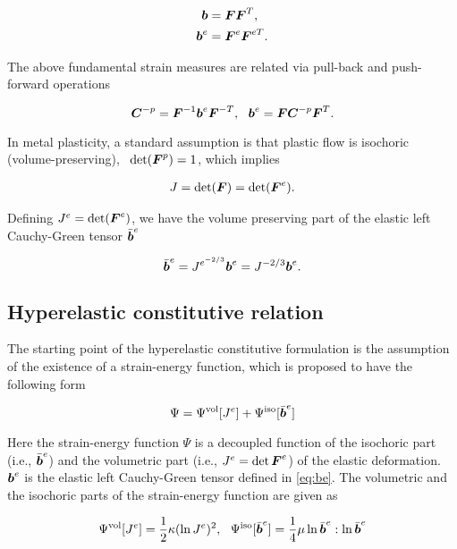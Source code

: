 \begin{align}
  {\boldsymbol{b}} &= {\boldsymbol{F}} {\boldsymbol{F}}^{T},\\
  {\boldsymbol{b}}^e &= {\boldsymbol{F}}^e {\boldsymbol{F}}^{eT}.\label{eq:be}\\
\end{align}

The above fundamental strain measures are related via pull-back and
push-forward operations

\begin{equation}\label{eq:pullpush}
  {\boldsymbol{C}}^{-p} ={\boldsymbol{F}}^{-1} {\boldsymbol{b}}^e {\boldsymbol{F}}^{-T},~~{\boldsymbol{b}}^e = {\boldsymbol{F}} {\boldsymbol{C}}^{-p} {\boldsymbol{F}}^T.
\end{equation}

In metal plasticity, a standard assumption is that plastic flow
is isochoric (volume-preserving), \ie\ $\det({\boldsymbol{F}}^p)=1$, which implies

\begin{align}
  J = \det ({\boldsymbol{F}}) = \det ({\boldsymbol{F}}^e).
\end{align}

Defining $J^e=\det({\boldsymbol{F}}^e)$, we have the volume preserving part of the
elastic left Cauchy-Green tensor $\bar{{\boldsymbol{b}}}^e$

\begin{equation}
  \bar{{\boldsymbol{b}}}^e = J^{e^{-2/3}}{\boldsymbol{b}}^e = J^{-2/3}{\boldsymbol{b}}^e.
\end{equation}

\subsection{Hyperelastic constitutive relation}

The starting point of the hyperelastic constitutive formulation is the assumption of the existence of a strain-energy function, which is proposed to have the following form

\begin{equation}
\Psi=\Psi^{\rm vol}[J^e] + \Psi^{\rm iso}[\bar{{\boldsymbol{b}}}^e]
\end{equation}

Here the strain-energy function $\Psi$ is a decoupled function of the isochoric part (i.e., $\bar{{\boldsymbol{b}}}^e$) and the volumetric part (i.e., $J^e=\det{\boldsymbol{F}}^e$) of the elastic deformation. ${\boldsymbol{b}}^e$ is the elastic left Cauchy-Green tensor defined in \eqref{eq:be}. The volumetric and the isochoric parts of the strain-energy function are given as

\begin{equation}
\Psi^{\rm vol}[J^e] =\frac{1}{2}\kappa(\ln J^e)^2,~~\Psi^{\rm iso}[\bar{{\boldsymbol{b}}}^e] = \frac{1}{4}\mu\ln\bar{{\boldsymbol{b}}}^e:\ln\bar{{\boldsymbol{b}}}^e
\end{equation}

